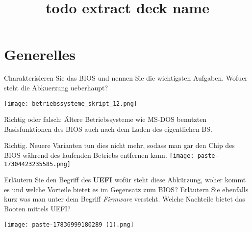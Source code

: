 \documentclass{article}
\title{todo extract deck name}
\begin{document}
\section{Generelles}
\begin{tcolorbox}[colback=white!10!white,colframe=lightgray!75!black,
  savelowerto=\jobname_ex.tex]

\begin{center}
Charakterisieren Sie das BIOS und nennen Sie die wichtigsten Aufgaben. Wofuer steht die Abkuerzung ueberhaupt?

\end{center}

\tcblower

\justifying
\texttt{[image: betriebssysteme\_skript\_12.png]}

\end{tcolorbox}
\begin{tcolorbox}[colback=white!10!white,colframe=lightgray!75!black,
  savelowerto=\jobname_ex.tex]

\begin{center}
Richtig oder falsch: Ältere Betriebssysteme wie MS-DOS benutzten Basisfunktionen des BIOS auch nach dem Laden des eigentlichen BS.

\end{center}

\tcblower

\justifying
Richtig. Neuere Varianten tun dies nicht mehr, sodass man gar den Chip des BIOS während des laufenden Betriebs entfernen kann.
\texttt{[image: paste-17304423235585.png]}

\end{tcolorbox}
\begin{tcolorbox}[colback=white!10!white,colframe=lightgray!75!black,
  savelowerto=\jobname_ex.tex]

\begin{center}
Erläutern Sie den Begriff des 
\textbf{UEFI
}wofür steht diese Abkürzung, woher kommt es und welche Vorteile bietet es im Gegensatz zum BIOS?
Erläutern Sie ebenfalls kurz was man unter dem Begriff 
\textit{Firmware 
}versteht.
Welche Nachteile bietet das Booten mittels UEFI?

\end{center}

\tcblower

\justifying
\texttt{[image: paste-17836999180289 (1).png]}

\end{tcolorbox}
\end{document}

